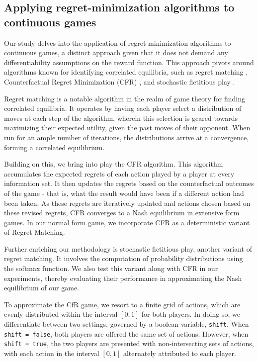 \documentclass[preprint,12pt,authoryear]{elsarticle}
\theoremstyle{definition}
\begin{document}
\subsection{Applying regret-minimization algorithms to continuous games}

Our study delves into the application of regret-minimization algorithms to continuous games, a distinct approach given that it does not demand any differentiability assumptions on the reward function. This approach pivots around algorithms known for identifying correlated equilibria, such as regret matching \citep{Hart1997-nk,hart2001reinforcement, hart2001reinforcementcorrection}, Counterfactual Regret Minimization (CFR) \citep{neller2013introduction}, and stochastic fictitious play \citep{fudenberg1993learning}.

Regret matching is a notable algorithm in the realm of game theory for finding correlated equilibria. It operates by having each player select a distribution of moves at each step of the algorithm, wherein this selection is geared towards maximizing their expected utility, given the past moves of their opponent. When run for an ample number of iterations, the distributions arrive at a convergence, forming a correlated equilibrium.

Building on this, we bring into play the CFR algorithm. This algorithm accumulates the expected regrets of each action played by a player at every information set. It then updates the regrets based on the counterfactual outcomes of the game - that is, what the result would have been if a different action had been taken. As these regrets are iteratively updated and actions chosen based on these revised regrets, CFR converges to a Nash equilibrium in extensive form games. In our normal form game, we incorporate CFR as a deterministic variant of Regret Matching.

Further enriching our methodology is stochastic fictitious play, another variant of regret matching. It involves the computation of probability distributions using the softmax function. We also test this variant along with CFR in our experiments, thereby evaluating their performance in approximating the Nash equilibrium of our game.

To approximate the CfR game, we resort to a finite grid of actions, which are evenly distributed within the interval $[0, 1]$ for both players. In doing so, we differentiate between two settings, governed by a boolean variable, \texttt{shift}. When \texttt{shift = false}, both players are offered the same set of actions. However, when \texttt{shift = true}, the two players are presented with non-intersecting sets of actions, with each action in the interval $[0, 1]$ alternately attributed to each player.
\end{document}
